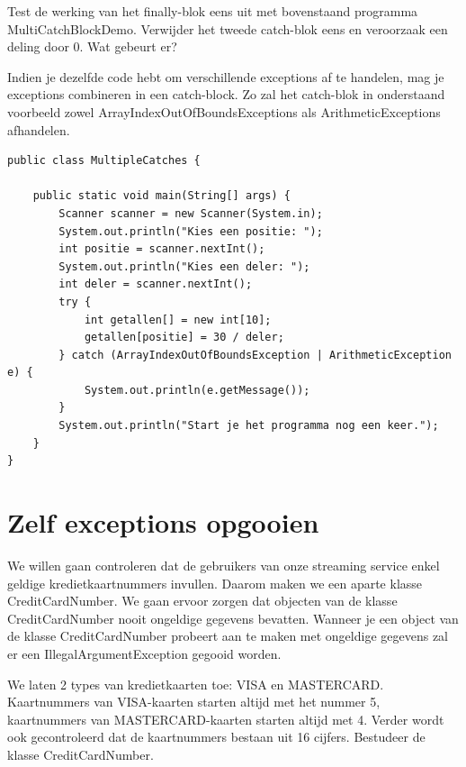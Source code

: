 \begin{oefening}
Test de werking van het finally-blok eens uit met bovenstaand programma MultiCatchBlockDemo. Verwijder het tweede catch-blok eens en veroorzaak een deling door 0. Wat gebeurt er?
\end{oefening}

Indien je dezelfde code hebt om verschillende exceptions af te handelen, mag je exceptions combineren in een catch-block. Zo zal het catch-blok in onderstaand voorbeeld zowel ArrayIndexOutOfBoundsExceptions als ArithmeticExceptions afhandelen.

\begin{lstlisting}
public class MultipleCatches {

	public static void main(String[] args) {
		Scanner scanner = new Scanner(System.in);
		System.out.println("Kies een positie: ");
		int positie = scanner.nextInt();
		System.out.println("Kies een deler: ");
		int deler = scanner.nextInt();
		try {
			int getallen[] = new int[10];
			getallen[positie] = 30 / deler;
		} catch (ArrayIndexOutOfBoundsException | ArithmeticException e) {
			System.out.println(e.getMessage());
		}
		System.out.println("Start je het programma nog een keer.");
	}
}
\end{lstlisting}

\section{Zelf exceptions opgooien}
We willen gaan controleren dat de gebruikers van onze streaming service enkel geldige kredietkaartnummers invullen. Daarom maken we een aparte klasse CreditCardNumber. We gaan ervoor zorgen dat objecten van de klasse CreditCardNumber nooit ongeldige gegevens bevatten. Wanneer je een object van de klasse CreditCardNumber probeert aan te maken met ongeldige gegevens zal er een IllegalArgumentException gegooid worden.

We laten 2 types van kredietkaarten toe: VISA en MASTERCARD. Kaartnummers van VISA-kaarten starten altijd met het nummer 5, kaartnummers van MASTERCARD-kaarten starten altijd met 4.
Verder wordt ook gecontroleerd dat de kaartnummers bestaan uit 16 cijfers. Bestudeer de klasse CreditCardNumber.

